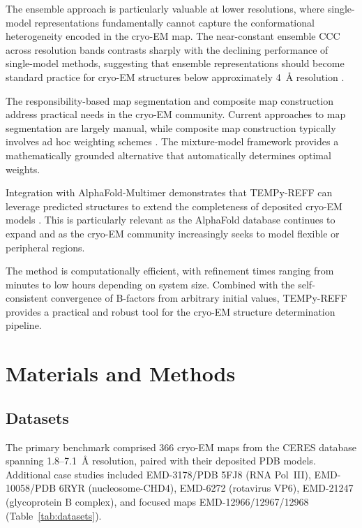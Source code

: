 \documentclass[11pt,a4paper]{article}
\begin{document}
The ensemble approach is particularly valuable at lower resolutions, where single-model representations fundamentally cannot capture the conformational heterogeneity encoded in the cryo-EM map. The near-constant ensemble CCC across resolution bands contrasts sharply with the declining performance of single-model methods, suggesting that ensemble representations should become standard practice for cryo-EM structures below approximately 4~\AA{} resolution \citep{Burnley2012, Bonvin2005}.

The responsibility-based map segmentation and composite map construction address practical needs in the cryo-EM community. Current approaches to map segmentation are largely manual, while composite map construction typically involves ad hoc weighting schemes \citep{Nakane2018}. The mixture-model framework provides a mathematically grounded alternative that automatically determines optimal weights.

Integration with AlphaFold-Multimer demonstrates that TEMPy-REFF can leverage predicted structures to extend the completeness of deposited cryo-EM models \citep{Jumper2021, Evans2022}. This is particularly relevant as the AlphaFold database continues to expand and as the cryo-EM community increasingly seeks to model flexible or peripheral regions.

The method is computationally efficient, with refinement times ranging from minutes to low hours depending on system size. Combined with the self-consistent convergence of B-factors from arbitrary initial values, TEMPy-REFF provides a practical and robust tool for the cryo-EM structure determination pipeline.

\section{Materials and Methods}

\subsection{Datasets}
The primary benchmark comprised 366 cryo-EM maps from the CERES database \citep{Croll2022} spanning 1.8--7.1~\AA{} resolution, paired with their deposited PDB models. Additional case studies included EMD-3178/PDB 5FJ8 (RNA Pol~III), EMD-10058/PDB 6RYR (nucleosome-CHD4), EMD-6272 (rotavirus VP6), EMD-21247 (glycoprotein B complex), and focused maps EMD-12966/12967/12968 (Table~\ref{tab:datasets}).
\end{document}
